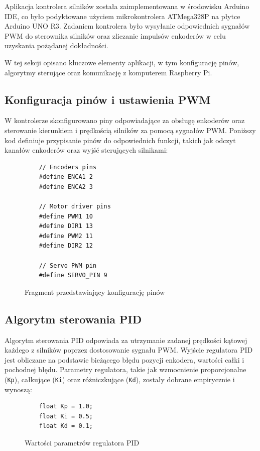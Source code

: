 Aplikacja kontrolera silników została zaimplementowana w środowisku Arduino IDE, co było podyktowane użyciem mikrokontrolera ATMega328P na płytce Arduino UNO R3. Zadaniem kontrolera było wysyłanie odpowiednich sygnałów PWM do sterownika silników oraz zliczanie impulsów enkoderów w celu uzyskania pożądanej dokładności. 

W tej sekcji opisano kluczowe elementy aplikacji, w tym konfigurację pinów, algorytmy sterujące oraz komunikację z komputerem Raspberry Pi.

\subsection{Konfiguracja pinów i ustawienia PWM}

W kontrolerze skonfigurowano piny odpowiadające za obsługę enkoderów oraz sterowanie kierunkiem i prędkością silników za pomocą sygnałów PWM. Poniższy kod definiuje przypisanie pinów do odpowiednich funkcji, takich jak odczyt kanałów enkoderów oraz wyjść sterujących silnikami:

\begin{figure}[h!]
  \centering
  \begin{lstlisting}
    // Encoders pins
    #define ENCA1 2 
    #define ENCA2 3 
    
    // Motor driver pins
    #define PWM1 10
    #define DIR1 13
    #define PWM2 11
    #define DIR2 12
    
    // Servo PWM pin
    #define SERVO_PIN 9
  \end{lstlisting}
  \caption{Fragment przedstawiający konfigurację pinów}
  \label{fig:config}
\end{figure}

\subsection{Algorytm sterowania PID}

Algorytm sterowania PID odpowiada za utrzymanie zadanej prędkości kątowej każdego z silników poprzez dostosowanie sygnału PWM. Wyjście regulatora PID jest obliczane na podstawie bieżącego błędu pozycji enkodera, wartości całki i pochodnej błędu. Parametry regulatora, takie jak wzmocnienie proporcjonalne (\texttt{Kp}), całkujące (\texttt{Ki}) oraz różniczkujące (\texttt{Kd}), zostały dobrane empirycznie i wynoszą:

\begin{figure}[h!]
  \centering
  \begin{lstlisting}
    float Kp = 1.0; 
    float Ki = 0.5; 
    float Kd = 0.1; 
  \end{lstlisting}
  \caption{Wartości parametrów regulatora PID}
  \label{fig:config-pid}
  \end{figure}

